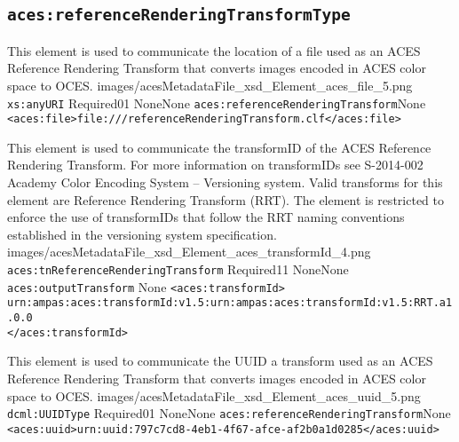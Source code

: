 \subsection{\texttt{aces:referenceRenderingTransformType}}

		{This element is used to communicate the location of a file used as an ACES Reference Rendering Transform that converts images encoded in ACES color space to OCES.}
		{images/acesMetadataFile_xsd_Element_aces_file_5.png}
		{\texttt{xs:anyURI}}
		{Required}{0}{1}
		{None}{None}
		{\texttt{aces:referenceRenderingTransform}}{None}
		{\lstinline{<aces:file>file:///referenceRenderingTransform.clf</aces:file>}}
		
        {This element is used to communicate the transformID of the ACES Reference Rendering Transform.  For more information on transformIDs see S-2014-002 Academy Color Encoding System -- Versioning system.  Valid transforms for this element are Reference Rendering Transform (RRT).  The element is restricted to enforce the use of transformIDs that follow the RRT naming conventions established in the versioning system specification.}
        {images/acesMetadataFile_xsd_Element_aces_transformId_4.png}
        {\texttt{aces:tnReferenceRenderingTransform}}
        {Required}{1}{1}
        {None}{None}
        {\texttt{aces:outputTransform}}
        {None}
        {\lstinline{<aces:transformId>}\\
        \lstinline{urn:ampas:aces:transformId:v1.5:urn:ampas:aces:transformId:v1.5:RRT.a1.0.0}\\
        \lstinline{</aces:transformId>}}

		{This element is used to communicate the UUID a transform used as an ACES Reference Rendering Transform that converts images encoded in ACES color space to OCES.}
		{images/acesMetadataFile_xsd_Element_aces_uuid_5.png}
		{\texttt{dcml:UUIDType}}
		{Required}{0}{1}
		{None}{None}
		{\texttt{aces:referenceRenderingTransform}}{None}
		{\lstinline{<aces:uuid>urn:uuid:797c7cd8-4eb1-4f67-afce-af2b0a1d0285</aces:uuid>}}